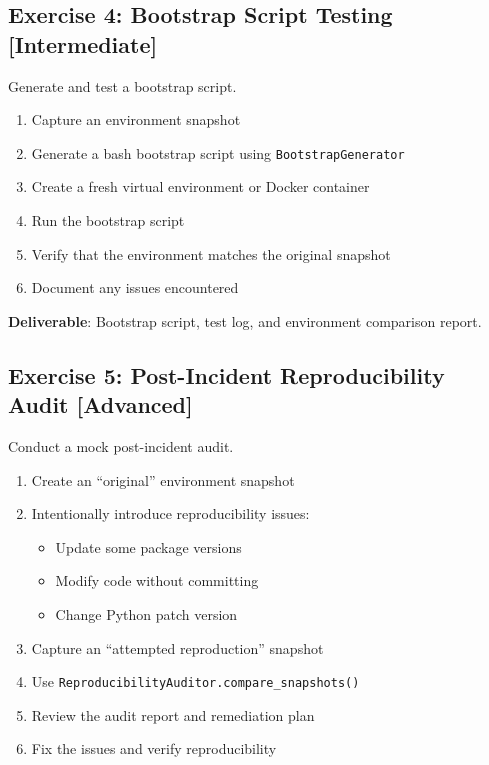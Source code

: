 \subsection{Exercise 4: Bootstrap Script Testing [Intermediate]}

Generate and test a bootstrap script.

\begin{enumerate}
    \item Capture an environment snapshot
    \item Generate a bash bootstrap script using \texttt{BootstrapGenerator}
    \item Create a fresh virtual environment or Docker container
    \item Run the bootstrap script
    \item Verify that the environment matches the original snapshot
    \item Document any issues encountered
\end{enumerate}

\textbf{Deliverable}: Bootstrap script, test log, and environment comparison report.

\subsection{Exercise 5: Post-Incident Reproducibility Audit [Advanced]}

Conduct a mock post-incident audit.

\begin{enumerate}
    \item Create an ``original'' environment snapshot
    \item Intentionally introduce reproducibility issues:
    \begin{itemize}
        \item Update some package versions
        \item Modify code without committing
        \item Change Python patch version
    \end{itemize}
    \item Capture an ``attempted reproduction'' snapshot
    \item Use \texttt{ReproducibilityAuditor.compare\_snapshots()}
    \item Review the audit report and remediation plan
    \item Fix the issues and verify reproducibility
\end{enumerate}

